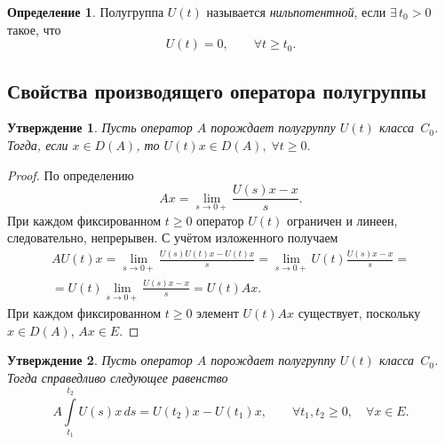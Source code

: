\documentclass{article}
\renewcommand{\ge}{\geqslant}
\newtheorem{statement}{Утверждение}
\theoremstyle{definition}
\newtheorem{definition}{Определение}
\begin{document}
\begin{definition} \label{nilpotent semigroup}
	Полугруппа $U(t)$ называется \textit{нильпотентной}, если \linebreak $\exists \, t_0 > 0$ такое, что
	\begin{equation*}
		U(t) = 0, \qquad \forall t \ge t_0.
	\end{equation*}
\end{definition}
\subsection{Свойства производящего оператора полугруппы}
\theoremstyle{definition}
\begin{statement} \label{U(t)x in D(A)}
	Пусть оператор $A$ порождает полугруппу $U(t)$ класса~$C_0$. Тогда,
	если $ x \in D(A) $, то $ U(t)x \in D(A), \; \forall t \ge 0. $
\end{statement}
\begin{proof}
	По определению
	\begin{equation*}
		Ax = \lim\limits_{s \rightarrow 0+} \frac{U(s)x - x}{s}.
	\end{equation*}
	При каждом фиксированном $t \ge 0$ оператор $U(t)$ ограничен и линеен, следовательно, непрерывен. С учётом изложенного получаем
	\begin{gather*}
		AU(t)x = \lim\limits_{s \rightarrow 0+} \frac{U(s)U(t)x - U(t)x}{s} = 
		\lim\limits_{s \rightarrow 0+} U(t)\frac{U(s)x - x}{s} = \\[3mm]
		= U(t)\lim\limits_{s \rightarrow 0+} \frac{U(s)x - x}{s} = U(t)Ax.
	\end{gather*}
	При каждом фиксированном $t \ge 0$ элемент $U(t)Ax$ существует, поскольку $x \in D(A)$, $Ax \in E$.
\end{proof}

\begin{statement} \label{A = d/dx}
	Пусть оператор $A$ порождает полугруппу $U(t)$ класса~$C_0$. Тогда 
	справедливо следующее равенство
	\begin{equation} \label{integral identity}
		A \int\limits_{t_1}^{t_2} U(s)x\,ds = U(t_2)x - U(t_1)x, \qquad \forall t_1, t_2 \ge 0, \quad \forall x \in E.
	\end{equation}
\end{statement}
\end{document}
